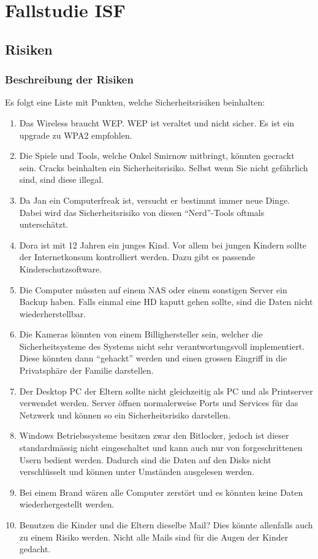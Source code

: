 \section{Fallstudie ISF}

\subsection{Risiken}

\subsubsection{Beschreibung der Risiken}

Es folgt eine Liste mit Punkten, welche Sicherheitsrisiken beinhalten:
\begin{enumerate}
\item Das Wireless braucht WEP. WEP ist veraltet und nicht sicher. Es ist ein upgrade
zu WPA2 empfohlen.
\item Die Spiele und Tools, welche Onkel Smirnow mitbringt, könnten gecrackt sein.
Cracks beinhalten ein Sicherheitsrisiko. Selbst wenn Sie nicht gefährlich sind, sind diese illegal.
\item Da Jan ein Computerfreak ist, versucht er bestimmt immer neue Dinge. Dabei wird das Sicherheitsrisiko von diesen “Nerd”-Tools oftmals unterschätzt.
\item Dora ist mit 12 Jahren ein junges Kind. Vor allem bei jungen Kindern sollte der
Internetkonsum kontrolliert werden. Dazu gibt es passende Kinderschutzsoftware.
\item Die Computer müssten auf einem NAS oder einem sonstigen Server ein Backup
haben. Falls einmal eine HD kaputt gehen sollte, sind die Daten nicht wiederherstellbar.
\item Die Kameras könnten von einem Billighersteller sein, welcher die Sicherheitsysteme
des Systems nicht sehr verantwortungsvoll implementiert. Diese könnten dann
“gehackt” werden und einen grossen Eingriff in die Privatsphäre der Familie darstellen.
\item Der Desktop PC der Eltern sollte nicht gleichzeitig als PC und als Printserver
verwendet werden. Server öffnen normalerweise Ports und Services für das Netzwerk
und können so ein Sicherheitsrisiko darstellen.
\item Windows Betriebssysteme besitzen zwar den Bitlocker, jedoch ist dieser standardmässig nicht eingeschaltet und kann auch nur von forgeschrittenen Usern bedient
werden. Dadurch sind die Daten auf den Disks nicht verschlüsselt und können unter
Umständen ausgelesen werden.
\item Bei einem Brand wären alle Computer zerstört und es könnten keine Daten wiederhergestellt werden.
\item Benutzen die Kinder und die Eltern dieselbe Mail? Dies könnte allenfalls auch zu
einem Risiko werden. Nicht alle Mails sind für die Augen der Kinder gedacht.
\end{enumerate}
\newpage

